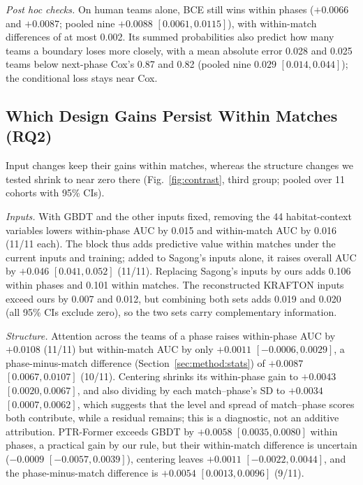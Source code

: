 \documentclass[sigconf,anonymous]{acmart}
\begin{document}
\emph{Post hoc checks.} On human teams alone, BCE still wins within phases ($+0.0066$ and $+0.0087$; pooled nine $+0.0088$ $[0.0061,\allowbreak 0.0115]$), with within-match differences of at most 0.002. Its summed probabilities also predict how many teams a boundary loses more closely, with a mean absolute error 0.028 and 0.025 teams below next-phase Cox's 0.87 and 0.82 (pooled nine $0.029$ $[0.014,\allowbreak 0.044]$); the conditional loss stays near Cox.

\subsection{Which Design Gains Persist Within Matches (RQ2)}
\label{sec:results:inputs}
Input changes keep their gains within matches, whereas the structure changes we tested shrink to near zero there (Fig.~\ref{fig:contrast}, third group; pooled over 11 cohorts with 95\% CIs).

\emph{Inputs.} With GBDT and the other inputs fixed, removing the 44 habitat-context variables lowers within-phase AUC by 0.015 and within-match AUC by 0.016 (11/11 each). The block thus adds predictive value within matches under the current inputs and training; added to Sagong's inputs alone, it raises overall AUC by $+0.046$ $[0.041,\allowbreak 0.052]$ (11/11). Replacing Sagong's inputs by ours adds 0.106 within phases and 0.101 within matches. The reconstructed KRAFTON inputs exceed ours by 0.007 and 0.012, but combining both sets adds 0.019 and 0.020 (all 95\% CIs exclude zero), so the two sets carry complementary information.

\emph{Structure.} Attention across the teams of a phase raises within-phase AUC by $+0.0108$ (11/11) but within-match AUC by only $+0.0011$ $[-0.0006,\allowbreak 0.0029]$, a phase-minus-match difference (Section~\ref{sec:method:stats}) of $+0.0087$ $[0.0067,\allowbreak 0.0107]$ (10/11). Centering shrinks its within-phase gain to $+0.0043$ $[0.0020,\allowbreak 0.0067]$, and also dividing by each match--phase's SD to $+0.0034$ $[0.0007,\allowbreak 0.0062]$, which suggests that the level and spread of match--phase scores both contribute, while a residual remains; this is a diagnostic, not an additive attribution. PTR-Former exceeds GBDT by $+0.0058$ $[0.0035,\allowbreak 0.0080]$ within phases, a practical gain by our rule, but their within-match difference is uncertain ($-0.0009$ $[-0.0057,\allowbreak 0.0039]$), centering leaves $+0.0011$ $[-0.0022,\allowbreak 0.0044]$, and the phase-minus-match difference is $+0.0054$ $[0.0013,\allowbreak 0.0096]$ (9/11).
\end{document}
